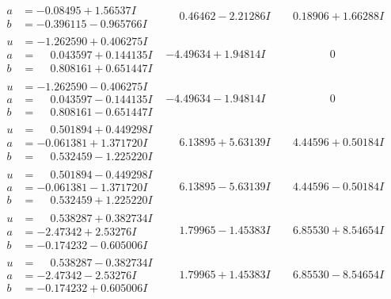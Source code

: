 \documentclass[1p]{elsarticle_modified}
\theoremstyle{definition}
\begin{document}
$$\begin{array}{c|c|c}
\begin{aligned}
a &= -0.08495 + 1.56537 I \\
b &= -0.396115 - 0.965766 I\end{aligned}
 & \phantom{-}0.46462 - 2.21286 I & \phantom{-}0.18906 + 1.66288 I \\ \hline\begin{aligned}
u &= -1.262590 + 0.406275 I \\
a &= \phantom{-}0.043597 + 0.144135 I \\
b &= \phantom{-}0.808161 + 0.651447 I\end{aligned}
 & -4.49634 + 1.94814 I & \phantom{-0.000000 } 0 \\ \hline\begin{aligned}
u &= -1.262590 - 0.406275 I \\
a &= \phantom{-}0.043597 - 0.144135 I \\
b &= \phantom{-}0.808161 - 0.651447 I\end{aligned}
 & -4.49634 - 1.94814 I & \phantom{-0.000000 } 0 \\ \hline\begin{aligned}
u &= \phantom{-}0.501894 + 0.449298 I \\
a &= -0.061381 + 1.371720 I \\
b &= \phantom{-}0.532459 - 1.225220 I\end{aligned}
 & \phantom{-}6.13895 + 5.63139 I & \phantom{-}4.44596 + 0.50184 I \\ \hline\begin{aligned}
u &= \phantom{-}0.501894 - 0.449298 I \\
a &= -0.061381 - 1.371720 I \\
b &= \phantom{-}0.532459 + 1.225220 I\end{aligned}
 & \phantom{-}6.13895 - 5.63139 I & \phantom{-}4.44596 - 0.50184 I \\ \hline\begin{aligned}
u &= \phantom{-}0.538287 + 0.382734 I \\
a &= -2.47342 + 2.53276 I \\
b &= -0.174232 - 0.605006 I\end{aligned}
 & \phantom{-}1.79965 - 1.45383 I & \phantom{-}6.85530 + 8.54654 I \\ \hline\begin{aligned}
u &= \phantom{-}0.538287 - 0.382734 I \\
a &= -2.47342 - 2.53276 I \\
b &= -0.174232 + 0.605006 I\end{aligned}
 & \phantom{-}1.79965 + 1.45383 I & \phantom{-}6.85530 - 8.54654 I \\ \hline\begin{aligned}

\end{aligned}
\end{array}$$
\end{document}
